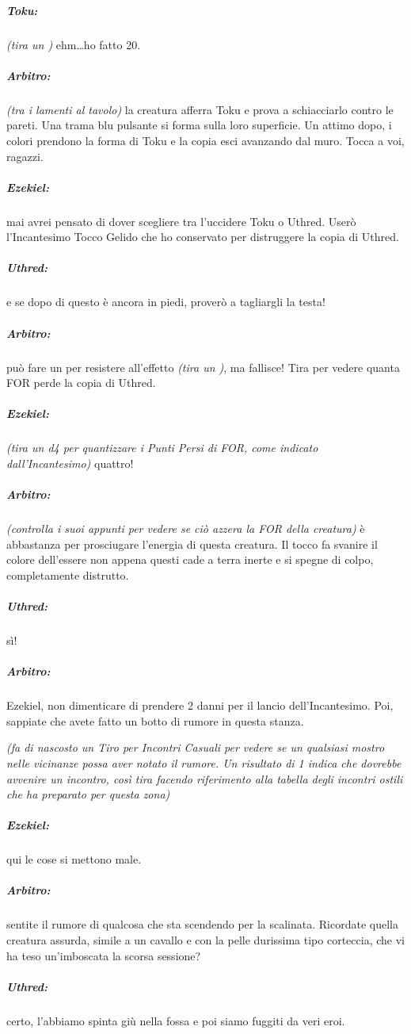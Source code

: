 \documentclass[itdr]{subfiles}
\begin{document}
{\subparagraph{Toku:} {\em (tira un )} ehm\ldots ho fatto 20.

\subparagraph{Arbitro:} {\em (tra i lamenti al tavolo)} la creatura afferra Toku e prova a schiacciarlo contro le pareti. Una trama blu pulsante si forma sulla loro superficie. Un attimo dopo, i colori prendono la forma di Toku e la copia esci avanzando dal muro. Tocca a voi, ragazzi.

\subparagraph{Ezekiel:} mai avrei pensato di dover scegliere tra l'uccidere Toku o Uthred. Userò l'Incantesimo Tocco Gelido che ho conservato per distruggere la copia di Uthred.

\subparagraph{Uthred:} e se dopo di questo è ancora in piedi, proverò a tagliargli la testa!

\break

\subparagraph{Arbitro:} può fare un  per resistere all'effetto {\em (tira un )}, ma fallisce! Tira per vedere quanta FOR perde la copia di Uthred.

\subparagraph{Ezekiel:} {\em (tira un d4 per quantizzare i Punti Persi di FOR, come indicato dall'Incantesimo)} quattro!

\subparagraph{Arbitro:} {\em (controlla i suoi appunti per vedere se ciò azzera la FOR della creatura)} è abbastanza per prosciugare l'energia di questa creatura. Il tocco fa svanire il colore dell'essere non appena questi cade a terra inerte e si spegne di colpo, completamente distrutto.

\subparagraph{Uthred:} sì!

\subparagraph{Arbitro:} Ezekiel, non dimenticare di prendere 2 danni per il lancio dell'Incantesimo. Poi, sappiate che avete fatto un botto di rumore in questa stanza.

{\em (fa di nascosto un Tiro per Incontri Casuali per vedere se un qualsiasi mostro nelle vicinanze possa aver notato il rumore. Un risultato di 1 indica che dovrebbe avvenire un incontro, così tira facendo riferimento alla tabella degli incontri ostili che ha preparato per questa zona)}

\subparagraph{Ezekiel:} qui le cose si mettono male.

\subparagraph{Arbitro:} sentite il rumore di qualcosa che sta scendendo per la scalinata. Ricordate quella creatura assurda, simile a un cavallo e con la pelle durissima tipo corteccia, che vi ha teso un'imboscata la scorsa sessione?

\subparagraph{Uthred:} certo, l'abbiamo spinta giù nella fossa e poi siamo fuggiti da veri eroi.

}
\end{document}
